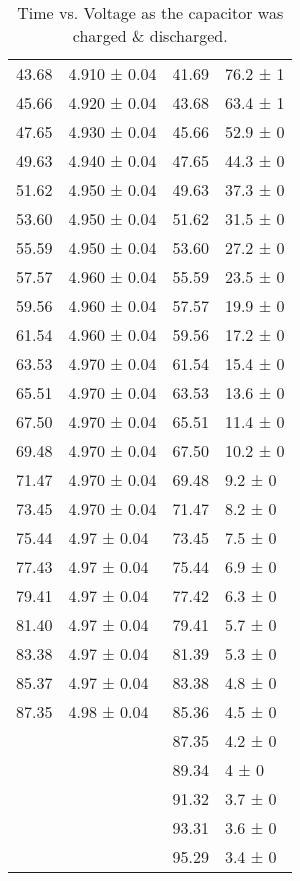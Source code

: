 \documentclass{article}
\begin{document}
\begin{table}[]
\begin{tabular}{@{}ll|ll@{}}
		43.68  & 4.910 ± 0.04 & 41.69        & 76.2 ± 1         \\
		45.66  & 4.920 ± 0.04 & 43.68        & 63.4 ± 1         \\
		47.65  & 4.930 ± 0.04 & 45.66        & 52.9 ± 0         \\
		49.63  & 4.940 ± 0.04 & 47.65        & 44.3 ± 0         \\
		51.62  & 4.950 ± 0.04 & 49.63        & 37.3 ± 0         \\
		53.60  & 4.950 ± 0.04 & 51.62        & 31.5 ± 0         \\
		55.59  & 4.950 ± 0.04 & 53.60        & 27.2 ± 0         \\
		57.57  & 4.960 ± 0.04 & 55.59        & 23.5 ± 0         \\
		59.56  & 4.960 ± 0.04 & 57.57        & 19.9 ± 0         \\
		61.54  & 4.960 ± 0.04 & 59.56        & 17.2 ± 0         \\
		63.53  & 4.970 ± 0.04 & 61.54        & 15.4 ± 0         \\
		65.51  & 4.970 ± 0.04 & 63.53        & 13.6 ± 0         \\
		67.50  & 4.970 ± 0.04 & 65.51        & 11.4 ± 0         \\
		69.48  & 4.970 ± 0.04 & 67.50        & 10.2 ± 0         \\
		71.47  & 4.970 ± 0.04 & 69.48        & 9.2 ± 0          \\
		73.45  & 4.970 ± 0.04 & 71.47        & 8.2 ± 0          \\
		75.44  & 4.97 ± 0.04  & 73.45        & 7.5 ± 0          \\
		77.43  & 4.97 ± 0.04  & 75.44        & 6.9 ± 0          \\
		79.41  & 4.97 ± 0.04  & 77.42        & 6.3 ± 0          \\
		81.40  & 4.97 ± 0.04  & 79.41        & 5.7 ± 0          \\
		83.38  & 4.97 ± 0.04  & 81.39        & 5.3 ± 0          \\
		85.37  & 4.97 ± 0.04  & 83.38        & 4.8 ± 0          \\
		87.35  & 4.98 ± 0.04  & 85.36        & 4.5 ± 0          \\
		&              & 87.35        & 4.2 ± 0          \\
		&              & 89.34        & 4 ± 0            \\
		&              & 91.32        & 3.7 ± 0          \\
		&              & 93.31        & 3.6 ± 0          \\
		&              & 95.29        & 3.4 ± 0          \\ \bottomrule
	\end{tabular}
	\caption{Time vs. Voltage as the capacitor was charged \& discharged.}
	\label{chdch}
\end{table}
\end{document}
